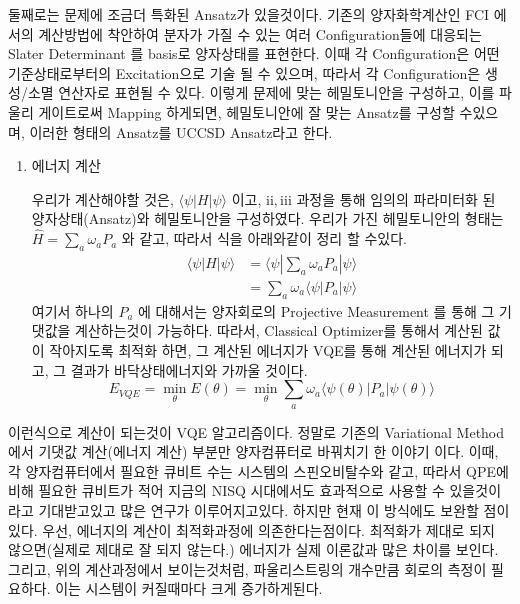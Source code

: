 \documentclass[10pt]{article}
\begin{document}
\begin{enumerate}[label=3)]
\begin{enumerate}[label=\(\mathrm{ii}\))]
둘째로는 문제에 조금더 특화된 Ansatz가 있을것이다. 기존의 양자화학계산인 FCI 에서의 계산방법에 착안하여
분자가 가질 수 있는 여러 Configuration들에 대응되는 Slater Determinant 를 basis로 양자상태를 표현한다. 
이때 각 Configuration은 어떤 기준상태로부터의 Excitation으로 기술 될 수 있으며, 따라서 각 Configuration은 생성/소멸 연산자로 표현될 수 있다. 
이렇게 문제에 맞는 헤밀토니안을 구성하고, 이를 파울리 게이트로써 Mapping 하게되면, 헤밀토니안에 잘 맞는 Ansatz를 구성할 수있으며, 이러한 형태의 Ansatz를 UCCSD Ansatz라고 한다. 
\end{enumerate}

\begin{enumerate}[label=\(\mathrm{iii}\))]
\item {에너지 계산}

우리가 계산해야할 것은, \(\langle \psi|H|\psi \rangle\) 이고, \(\mathrm{ii}, \mathrm{iii}\) 과정을 통해 임의의 파라미터화 된 양자상태(Ansatz)와 헤밀토니안을 구성하였다. 
우리가 가진 헤밀토니안의 형태는 \(\hat{H} = \sum_{a} \omega_a P_a\) 와 같고, 따라서 식을 아래와같이 정리 할 수있다. 
\begin{align*}
\langle \psi|H|\psi \rangle &= \langle \psi|\sum_{a} \omega_a P_a|\psi \rangle \\
&=\sum_{a} \omega_a \langle \psi|P_a|\psi \rangle
\end{align*}
여기서 하나의 \(P_a\) 에 대해서는 양자회로의 Projective Measurement 를 통해 그 기댓값을 계산하는것이 가능하다. 
따라서, Classical Optimizer를 통해서 계산된 값이 작아지도록 최적화 하면, 그 계산된 에너지가 VQE를 통해 계산된 에너지가 되고, 그 결과가 바닥상태에너지와 가까울 것이다.
\[
E_{VQE} =\min_\theta E(\theta) = \min_\theta \sum_{a} \omega_a \langle \psi(\theta)|P_a|\psi(\theta)\rangle
\]

\end{enumerate}
이런식으로 계산이 되는것이 VQE 알고리즘이다. 정말로 기존의 Variational Method 에서 기댓값 계산(에너지 계산) 부분만 양자컴퓨터로 바꿔치기 한 이야기 이다. 
이때, 각 양자컴퓨터에서 필요한 큐비트 수는 시스템의 스핀오비탈수와 같고, 따라서 QPE에 비해 필요한 큐비트가 적어 지금의 NISQ 시대에서도 효과적으로 사용할 수 있을것이라고 기대받고있고 많은 연구가 이루어지고있다. 
하지만 현재 이 방식에도 보완할 점이 있다. 우선, 에너지의 계산이 최적화과정에 의존한다는점이다. 최적화가 제대로 되지 않으면(실제로 제대로 잘 되지 않는다.) 에너지가 실제 이론값과 많은 차이를 보인다. 그리고, 위의 계산과정에서 보이는것처럼,
파울리스트링의 개수만큼 회로의 측정이 필요하다. 이는 시스템이 커질때마다 크게 증가하게된다. 


\end{enumerate}
\end{document}
